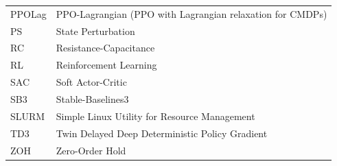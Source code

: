 \documentclass[12pt, letterpaper]{report}
\begin{document}
\begin{tabular}{@{}ll@{}}
PPOLag & PPO-Lagrangian (PPO with Lagrangian relaxation for CMDPs) \\
PS & State Perturbation \\
RC & Resistance-Capacitance \\
RL & Reinforcement Learning \\
SAC & Soft Actor-Critic \\
SB3 & Stable-Baselines3 \\
SLURM & Simple Linux Utility for Resource Management \\
TD3 & Twin Delayed Deep Deterministic Policy Gradient \\
ZOH & Zero-Order Hold \\
\bottomrule
\end{tabular}










\end{document}
